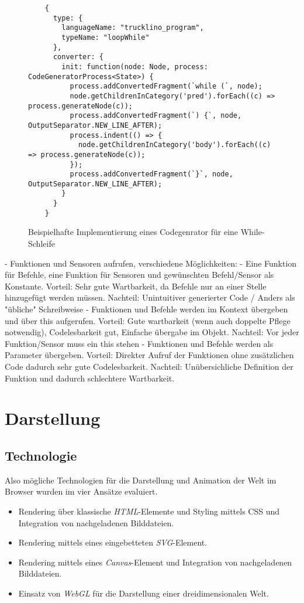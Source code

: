 \begin{figure}[h]
  \begin{lstlisting}
    {
      type: {
        languageName: "trucklino_program",
        typeName: "loopWhile"
      },
      converter: {
        init: function(node: Node, process: CodeGeneratorProcess<State>) {
          process.addConvertedFragment(`while (`, node);
          node.getChildrenInCategory('pred').forEach((c) => process.generateNode(c));
          process.addConvertedFragment(`) {`, node, OutputSeparator.NEW_LINE_AFTER);
          process.indent(() => {
            node.getChildrenInCategory('body').forEach((c) => process.generateNode(c));
          });
          process.addConvertedFragment(`}`, node, OutputSeparator.NEW_LINE_AFTER);
        }
      }
    }
  \end{lstlisting}
  \caption{Beispielhafte Implementierung eines Codegenrator für eine While-Schleife}
  \label{fig:implementation:program:evaluation:while}
\end{figure}

- Funktionen und Sensoren aufrufen, verschiedene Möglichkeiten:
    - Eine Funktion für Befehle, eine Funktion für Sensoren und gewünschten Befehl/Sensor als Konstante. Vorteil: Sehr gute Wartbarkeit, da Befehle nur an einer Stelle hinzugefügt werden müssen. Nachteil: Unintuitiver generierter Code / Anders als "übliche" Schreibweise
    - Funktionen und Befehle werden im Kontext übergeben und über this aufgerufen. Vorteil: Gute wartbarkeit (wenn auch doppelte Pflege notwendig), Codelesbarkeit gut, Einfache übergabe im Objekt. Nachteil: Vor jeder Funktion/Sensor muss ein this stehen
    - Funktionen und Befehle werden als Parameter übergeben. Vorteil: Direkter Aufruf der Funktionen ohne zusätzlichen Code dadurch sehr gute Codelesbarkeit. Nachteil: Unübersichliche Definition der Funktion und dadurch schlechtere Wartbarkeit.

\section{Darstellung}

\subsection{Technologie}

Also mögliche Technologien für die Darstellung und Animation der Welt im Browser wurden im vier Ansätze evaluiert.

\begin{itemize}
  \item Rendering über klassische \emph{HTML}-Elemente und Styling mittels CSS und Integration von nachgeladenen Bilddateien.
  \item Rendering mittels eines eingebetteten \emph{SVG}-Element.
  \item Rendering mittels eines \emph{Canvas}-Element und Integration von nachgeladenen Bilddateien.
  \item Einsatz von \emph{WebGL} für die Darstellung einer dreidimensionalen Welt.
\end{itemize}

